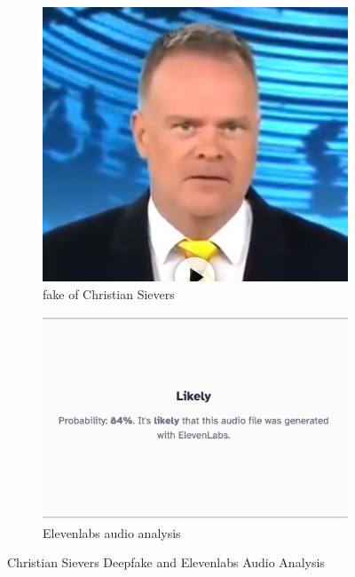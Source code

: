 \documentclass[
  a4paper,  %
  twoside,  %
  bibliography=totoc,
  headsepline,
  cleardoublepage=empty,
  parskip=half,
  draft=false
]{scrbook}
\begin{document}
\begin{figure}[h]
  \centering
  \begin{subfigure}[b]{0.45\textwidth}
    \includegraphics[width=\textwidth]{./graphics/sievers.png}
    \caption{fake of Christian Sievers \cite{zdfDeepfakeMitZDFModerator}}
    \label{fig:sievers-fake}
  \end{subfigure}
  \hfill
  \begin{subfigure}[b]{0.5\textwidth}
    \includegraphics[width=\textwidth]{./graphics/sievers-11labs.png}
    \caption{Elevenlabs audio analysis \cite{elevenlabsAISpeechClassifier}}
    \label{fig:sievers-11labs}
  \end{subfigure}
  \caption{Christian Sievers Deepfake and Elevenlabs Audio Analysis}
\end{figure}
\end{document}

